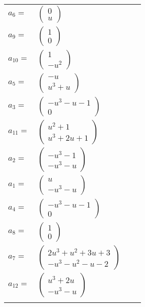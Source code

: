 \documentclass[1p]{elsarticle_modified}
\theoremstyle{definition}
\begin{document}
\begin{tabular}{m{7pt} m{180pt} m{7pt} m{180pt} }
\flushright $a_{6}=$&$\begin{pmatrix}0\\u\end{pmatrix}$ \\
\flushright $a_{9}=$&$\begin{pmatrix}1\\0\end{pmatrix}$ \\
\flushright $a_{10}=$&$\begin{pmatrix}1\\- u^2\end{pmatrix}$ \\
\flushright $a_{5}=$&$\begin{pmatrix}- u\\u^3+u\end{pmatrix}$ \\
\flushright $a_{3}=$&$\begin{pmatrix}- u^3- u-1\\0\end{pmatrix}$ \\
\flushright $a_{11}=$&$\begin{pmatrix}u^2+1\\u^3+2 u+1\end{pmatrix}$ \\
\flushright $a_{2}=$&$\begin{pmatrix}- u^3-1\\- u^3- u\end{pmatrix}$ \\
\flushright $a_{1}=$&$\begin{pmatrix}u\\- u^3- u\end{pmatrix}$ \\
\flushright $a_{4}=$&$\begin{pmatrix}- u^3- u-1\\0\end{pmatrix}$ \\
\flushright $a_{8}=$&$\begin{pmatrix}1\\0\end{pmatrix}$ \\
\flushright $a_{7}=$&$\begin{pmatrix}2 u^3+u^2+3 u+3\\- u^3- u^2- u-2\end{pmatrix}$ \\
\flushright $a_{12}=$&$\begin{pmatrix}u^3+2 u\\- u^3- u\end{pmatrix}$\\&\end{tabular}
\end{document}

